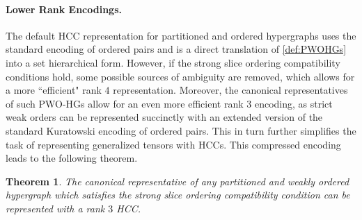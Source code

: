 \documentclass{article}
\theoremstyle{plain}
\newtheorem{theorem}{Theorem}[section]
\theoremstyle{definition}
\theoremstyle{remark}
\let\oldparagraph\paragraph
\renewcommand{\paragraph}[1]{%
	\vspace{-0.5em}%
	\oldparagraph{#1}%
}
\begin{document}
\paragraph{Lower Rank Encodings.} The default HCC representation for partitioned and ordered hypergraphs uses the standard encoding of ordered pairs and is a direct translation of \cref{def:PWOHGs} into a set hierarchical form. However, if the strong slice ordering compatibility conditions hold, some possible sources of ambiguity are removed, which allows for a more ``efficient" rank $4$ representation. Moreover, the canonical representatives of such PWO-HGs allow for an even more efficient rank $3$ encoding, as strict weak orders can be represented succinctly with an extended version of the standard Kuratowski encoding of ordered pairs. This in turn further simplifies the task of representing generalized tensors with HCCs. This compressed encoding leads to the following theorem.
\begin{theorem}
	The canonical representative of any partitioned and weakly ordered hypergraph which satisfies the strong slice ordering compatibility condition can be represented with a rank $3$ HCC.
	\label{thrm:PWOHG_Encoding}
\end{theorem}
\end{document}
